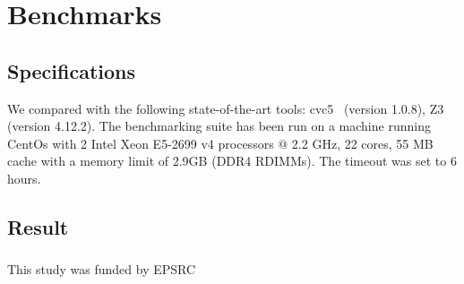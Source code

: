 \documentclass[runningheads]{llncs}
\begin{document}
\section{Benchmarks}

\subsection*{Specifications}

We compared \dlinear with the following state-of-the-art tools: cvc5~\cite{ref:cvc5} (version 1.0.8), Z3~\cite{ref:z3} (version 4.12.2).
The benchmarking suite has been run on a machine running CentOs with 2 Intel Xeon E5-2699 v4 processors @ 2.2 GHz, 22 cores, 55 MB cache with a memory limit of 2.9GB (DDR4 RDIMMs).
The timeout was set to 6 hours.

\subsection*{Result}


\begin{credits}
    \subsubsection{\ackname} This study was funded by EPSRC
\end{credits}




\end{document}
